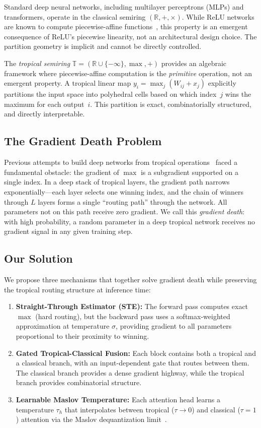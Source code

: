 \documentclass[11pt,twocolumn]{article}
\newcommand{\R}{\mathbb{R}}
\newcommand{\T}{\mathbb{T}}
\begin{document}
Standard deep neural networks, including multilayer perceptrons (MLPs) and
transformers, operate in the classical semiring $(\R, +, \times)$. While
ReLU networks are known to compute piecewise-affine
functions~\cite{montufar2014number}, this property is an emergent consequence
of ReLU's piecewise linearity, not an architectural design choice. The
partition geometry is implicit and cannot be directly controlled.

The \emph{tropical semiring} $\T = (\R \cup \{-\infty\}, \max, +)$ provides
an algebraic framework where piecewise-affine computation is the
\emph{primitive} operation, not an emergent property. A tropical linear
map $y_i = \max_j(W_{ij} + x_j)$ explicitly partitions the input space into
polyhedral cells based on which index~$j$ wins the maximum for each
output~$i$. This partition is exact, combinatorially structured, and directly
interpretable.

\subsection{The Gradient Death Problem}

Previous attempts to build deep networks from tropical
operations~\cite{zhang2018tropical,charisopoulos2018morphological} faced a
fundamental obstacle: the gradient of $\max$ is a subgradient supported on a
single index. In a deep stack of tropical layers, the gradient path narrows
exponentially---each layer selects one winning index, and the chain of winners
through $L$ layers forms a single ``routing path'' through the network. All
parameters not on this path receive zero gradient. We call this
\emph{gradient death}: with high probability, a random parameter in a deep
tropical network receives no gradient signal in any given training step.

\subsection{Our Solution}

We propose three mechanisms that together solve gradient death while
preserving the tropical routing structure at inference time:

\begin{enumerate}[nosep]
  \item \textbf{Straight-Through Estimator (STE):} The forward pass computes
    exact $\max$ (hard routing), but the backward pass uses a
    softmax-weighted approximation at temperature $\sigma$, providing gradient
    to all parameters proportional to their proximity to winning.
  \item \textbf{Gated Tropical-Classical Fusion:} Each block contains both
    a tropical and a classical branch, with an input-dependent gate that
    routes between them. The classical branch provides a dense gradient
    highway, while the tropical branch provides combinatorial structure.
  \item \textbf{Learnable Maslov Temperature:} Each attention head learns
    a temperature $\tau_h$ that interpolates between tropical ($\tau \to 0$)
    and classical ($\tau = 1$) attention via the Maslov dequantization
    limit~\cite{litvinov2007maslov}.
\end{enumerate}
\end{document}
